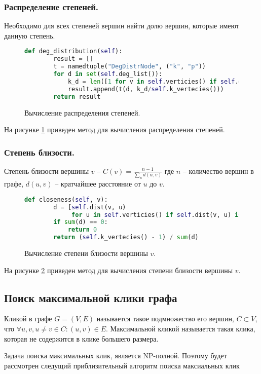 \subsubsection{Распределение степеней.}
Необходимо для всех степеней вершин найти долю вершин,
которые имеют данную степень.
\begin{figure}[H] 
\begin{lstlisting}[language=Python] 
    def deg_distribution(self):
        result = []
        t = namedtuple("DegDistrNode", ("k", "p"))
        for d in set(self.deg_list()):
            k_d = len([1 for v in self.verticies() if self.deg(v) == d])
            result.append(t(d, k_d/self.k_vertecies()))
        return result
\end{lstlisting}  
    \caption{Вычисление распределения степеней.}
    \label{degdistr}
\end{figure} 
На рисунке \ref{degdistr}  приведен метод для вычисления
распределения степеней.
\subsubsection{Степень близости.}
Степень близости вершины $v$  --  $C(v) = \frac{n - 1}{\sum_{u} d(u,v)}$ 
где $n$ -- количество вершин в графе,  $d(u,v)$ -- 
кратчайшее расстояние от  $u$ до  $v$.
\begin{figure}[H] 
\begin{lstlisting}[language=Python] 
    def closeness(self, v):
        d = [self.dist(v, u)
             for u in self.verticies() if self.dist(v, u) is not None]
        if sum(d) == 0:
            return 0
        return (self.k_vertecies() - 1) / sum(d)
\end{lstlisting}  
    \caption{Вычисление степени близости вершины $v$.}
    \label{closeg}
\end{figure} 
На рисунке \ref{closeg} приведен метод для вычисления степени
близости вершины $v$.
\subsection{Поиск максимальной клики графа}
Кликой в графе $G = (V,E)$ называется такое подмножество  его вершин,
$C \subset V$, что $\forall u,v , u \neq v \in C : (u,v) \in E$.
Максимальной кликой называется такая клика, которая
не содержится в клике большего размера.

Задача поиска
максимальных клик, является NP-полной. Поэтому будет 
рассмотрен следущий приблизительный алгоритм поиска
максиальных клик \cite{clique}

